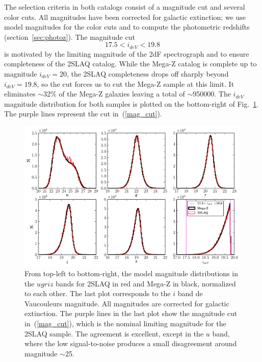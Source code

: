 The selection criteria in both catalogs consist of a magnitude cut and several color cuts. All magnitudes have been corrected for galactic extinction;  we use model magnitudes for the color cuts and to compute the photometric redshifts (section~\ref{sec:photoz}). The magnitude cut 
\begin{equation}
17.5<i_{deV}<19.8
\label{mag_cut}
\end{equation}
is motivated by the limiting magnitude of the 2dF spectrograph and to ensure completeness of the 2SLAQ catalog. While the Mega-Z catalog is complete up to magnitude $i_{deV}=20$, the 2SLAQ completeness drops off sharply beyond $i_{deV}=19.8$, so the cut forces us to cut the Mega-Z sample at this limit. It eliminates $\sim$32\% of the Mega-Z galaxies leaving a total of $\sim$950000. The $i_{deV}$ magnitude distribution for both samples is plotted on the bottom-right of Fig.~\ref{Nm_megaz}. The purple lines represent the cut in~(\ref{mag_cut}).

\begin{figure}
\centering
\includegraphics[type=pdf,ext=.pdf,read=.pdf, width=150mm]{./plots/Nm_megaz}
\caption{From top-left to bottom-right, the model magnitude distributions in the $ugriz$ bands for 2SLAQ in red and Mega-Z in black, normalized to each other. The last plot corresponds to the $i$ band de Vaucouleurs magnitude. All magnitudes are corrected for galactic extinction. The purple lines in the last plot show the magnitude cut 
in~(\ref{mag_cut}), which is the nominal limiting magnitude for the 2SLAQ sample. The agreement is excellent, except in the $u$ band, where the low signal-to-noise produces a small disagreement around magnitude $\sim$25.}
\label{Nm_megaz}
\end{figure}

